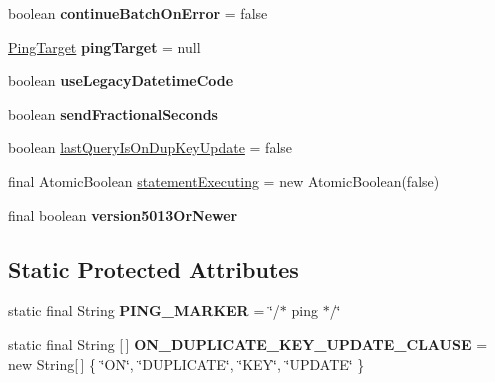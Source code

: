 \begin{DoxyCompactItemize}
boolean {\bfseries continue\+Batch\+On\+Error} = false
\item 
\mbox{\label{classcom_1_1mysql_1_1jdbc_1_1_statement_impl_a1b37cc9d9751a1dd12835e24bbbf863e}} 
\mbox{\hyperlink{interfacecom_1_1mysql_1_1jdbc_1_1_ping_target}{Ping\+Target}} {\bfseries ping\+Target} = null
\item 
\mbox{\label{classcom_1_1mysql_1_1jdbc_1_1_statement_impl_aefa396b88c35ad1aee3b1d66d9bd6313}} 
boolean {\bfseries use\+Legacy\+Datetime\+Code}
\item 
\mbox{\label{classcom_1_1mysql_1_1jdbc_1_1_statement_impl_af50195cd2fbba8d021bf65ab015044fc}} 
boolean {\bfseries send\+Fractional\+Seconds}
\item 
boolean \mbox{\hyperlink{classcom_1_1mysql_1_1jdbc_1_1_statement_impl_aaf131d3f978e9e75535501e659e9cd7c}{last\+Query\+Is\+On\+Dup\+Key\+Update}} = false
\item 
final Atomic\+Boolean \mbox{\hyperlink{classcom_1_1mysql_1_1jdbc_1_1_statement_impl_a101c71343b86142c0676a0372c2d4841}{statement\+Executing}} = new Atomic\+Boolean(false)
\item 
\mbox{\label{classcom_1_1mysql_1_1jdbc_1_1_statement_impl_a1750b34dc09f1a070efdb94a50586a7d}} 
final boolean {\bfseries version5013\+Or\+Newer}
\end{DoxyCompactItemize}
\subsection*{Static Protected Attributes}
\begin{DoxyCompactItemize}
\item 
\mbox{\label{classcom_1_1mysql_1_1jdbc_1_1_statement_impl_aefc51fd15b125ee6fc8489d704f2a665}} 
static final String {\bfseries P\+I\+N\+G\+\_\+\+M\+A\+R\+K\+ER} = \char`\"{}/$\ast$ ping $\ast$/\char`\"{}
\item 
\mbox{\label{classcom_1_1mysql_1_1jdbc_1_1_statement_impl_a2a15e63baac1e7995b86fadff15c3602}} 
static final String \mbox{[}$\,$\mbox{]} {\bfseries O\+N\+\_\+\+D\+U\+P\+L\+I\+C\+A\+T\+E\+\_\+\+K\+E\+Y\+\_\+\+U\+P\+D\+A\+T\+E\+\_\+\+C\+L\+A\+U\+SE} = new String\mbox{[}$\,$\mbox{]} \{ \char`\"{}ON\char`\"{}, \char`\"{}D\+U\+P\+L\+I\+C\+A\+TE\char`\"{}, \char`\"{}K\+EY\char`\"{}, \char`\"{}U\+P\+D\+A\+TE\char`\"{} \}
\end{DoxyCompactItemize}


